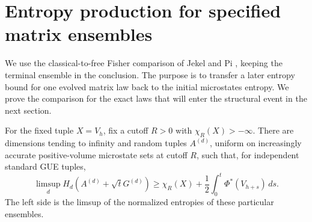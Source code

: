 \section{Entropy production for specified matrix ensembles}\label{sec:flow}

We use the classical-to-free Fisher comparison of
Jekel and Pi \cite[Proposition~6.1]{JP},
keeping the terminal ensemble in the conclusion. The purpose is to
transfer a later entropy bound for one evolved matrix law back to the
initial microstates entropy. We prove the comparison for the exact
laws that will enter the structural event in the next section.

\begin{lemma}\label{lem:flow}
For the fixed tuple $X=V_h$, fix a cutoff $R>0$ with
$\chi_R(X)>-\infty$. There are dimensions tending to infinity and
random tuples $A^{(d)}$, uniform on increasingly accurate
positive-volume microstate sets at cutoff $R$, such that, for independent
standard GUE tuples,
\begin{equation}\label{eq:flowlower}
 \limsup_d H_d(A^{(d)}+\sqrt t G^{(d)})
 \geq\chi_R(X)+\frac12\int_0^t\Phi^*(V_{h+s})\,ds.
\end{equation}
The left side is the limsup of the normalized entropies of these particular ensembles.
\end{lemma}

